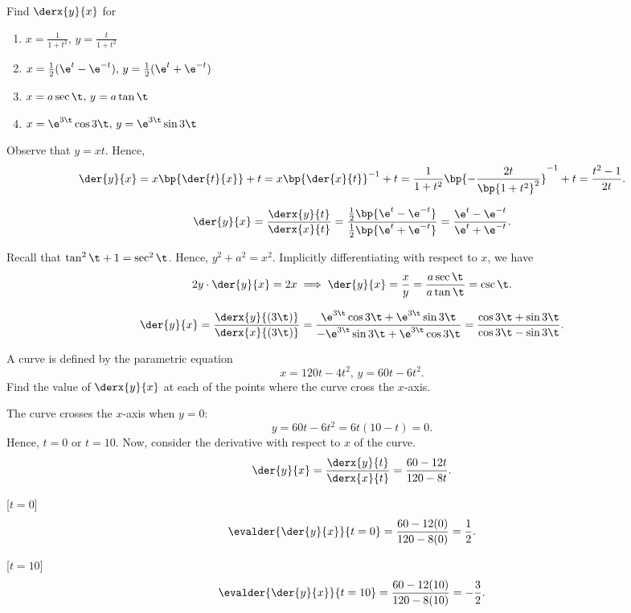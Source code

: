 \begin{problem}
    Find $\derx{y}{x}$ for

    \begin{enumerate}
        \item $x = \frac1{1+t^2}, \, y = \frac{t}{1+t^2}$
        \item $x = \frac12 (\e^t - \e^{-t}), \, y = \frac12 (\e^t + \e^{-t})$
        \item $x = a\sec\t, \, y = a\tan\t$
        \item $x = \e^{3\t}\cos{3\t}, \, y = \e^{3\t}\sin{3\t}$
    \end{enumerate}
\end{problem}
\begin{solution}
    \begin{ppart}
        Observe that $y = xt$. Hence, \[\der{y}{x} = x\bp{\der{t}{x}} + t = x \bp{\der{x}{t}}^{-1} + t = \frac1{1 + t^2} \bp{-\frac{2t}{\bp{1 + t^2}^2}}^{-1} + t = \frac{t^2-1}{2t}.\]
    \end{ppart}
    \begin{ppart}
        \[\der{y}{x} = \frac{\derx{y}{t}}{\derx{x}{t}} = \frac{\frac12 \bp{\e^t - \e^{-t}}}{\frac12 \bp{\e^t + \e^{-t}}} = \frac{\e^t - \e^{-t}}{\e^t + \e^{-t}}.\]
    \end{ppart}
    \begin{ppart}
        Recall that $\tan^2 \t + 1 = \sec^2 \t$. Hence, $y^2 + a^2 = x^2$. Implicitly differentiating with respect to $x$, we have \[2y\cdot\der{y}{x} = 2x \implies \der{y}{x} = \frac{x}{y} = \frac{a\sec \t}{a \tan \t} = \csc \t.\]
    \end{ppart}
    \begin{ppart}
        \[\der{y}{x} = \frac{\derx{y}{(3\t)}}{\derx{x}{(3\t)}} = \frac{\e^{3\t} \cos 3\t + \e^{3\t} \sin 3\t}{-\e^{3\t} \sin 3\t + \e^{3\t} \cos 3\t} = \frac{\cos 3\t + \sin 3\t}{\cos 3\t - \sin 3\t}.\]
    \end{ppart}
\end{solution}

\begin{problem}
    A curve is defined by the parametric equation \[x = 120t - 4t^2, \, y = 60t - 6t^2.\] Find the value of $\derx{y}{x}$ at each of the points where the curve cross the $x$-axis.
\end{problem}
\begin{solution}
    The curve crosses the $x$-axis when $y=0$: \[y = 60t-6t^2 = 6t(10 - t) = 0.\] Hence, $t = 0$ or $t = 10$. Now, consider the derivative with respect to $x$ of the curve. \[\der{y}{x} = \frac{\derx{y}{t}}{\derx{x}{t}} = \frac{60 - 12t}{120 - 8t}.\]

    [$t =0$] \[\evalder{\der{y}{x}}{t = 0} = \frac{60 - 12(0)}{120 - 8(0)} = \frac12.\]

    [$t=10$] \[\evalder{\der{y}{x}}{t = 10} = \frac{60 - 12(10)}{120 - 8(10)} = -\frac32.\]
\end{solution}


